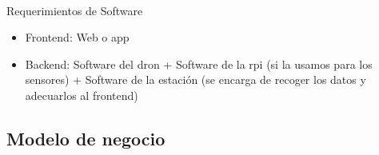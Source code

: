 \documentclass[11pt,spanish]{article} %
\begin{document}
\

Requerimientos de Software%
\begin{itemize}
	\item Frontend: Web o app
	\item Backend: Software del dron + Software de la rpi (si la usamos para los sensores) + Software de la estación (se encarga de recoger los datos y adecuarlos al frontend)	
\end{itemize}

\subsection{Modelo de negocio}



\newpage
\end{document}
